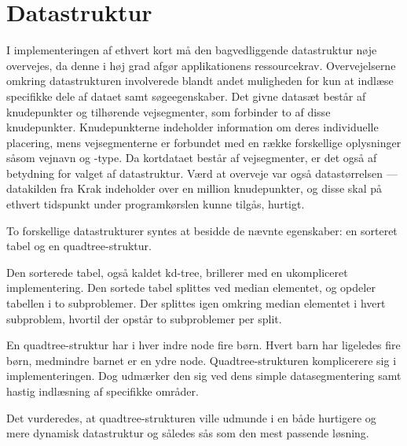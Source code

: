 \section{Datastruktur}
\label{sec:datastruktur}
I implementeringen af ethvert kort må den bagvedliggende datastruktur nøje overvejes, da denne i høj grad afgør applikationens ressourcekrav. Overvejelserne omkring datastrukturen involverede blandt andet muligheden for kun at indlæse specifikke dele af dataet samt søgeegenskaber. Det givne datasæt består af knudepunkter og tilhørende vejsegmenter, som forbinder to af disse knudepunkter. Knudepunkterne indeholder information om deres individuelle placering, mens vejsegmenterne er forbundet med en række forskellige oplysninger såsom vejnavn og -type. Da kortdataet består af vejsegmenter, er det også af betydning for valget af datastruktur. Værd at overveje var også datastørrelsen --- datakilden fra Krak indeholder over en million knudepunkter, og disse skal på ethvert tidspunkt under programkørslen kunne tilgås, hurtigt.

To forskellige datastrukturer syntes at besidde de nævnte egenskaber: en sorteret tabel og en quadtree-struktur. 

Den sorterede tabel, også kaldet kd-tree, brillerer med en ukompliceret implementering. Den sortede tabel splittes ved median elementet, og opdeler tabellen i to subproblemer. Der splittes igen omkring median elementet i hvert subproblem, hvortil der opstår to subproblemer per split. 

En quadtree-struktur har i hver indre node fire børn. Hvert barn har ligeledes fire børn, medmindre barnet er en ydre node. Quadtree-strukturen komplicerere sig i implementeringen. Dog udmærker den sig ved dens simple datasegmentering samt hastig indlæsning af specifikke områder. 

Det vurderedes, at quadtree-strukturen ville udmunde i en både hurtigere og mere dynamisk datastruktur og således sås som den mest passende løsning.
